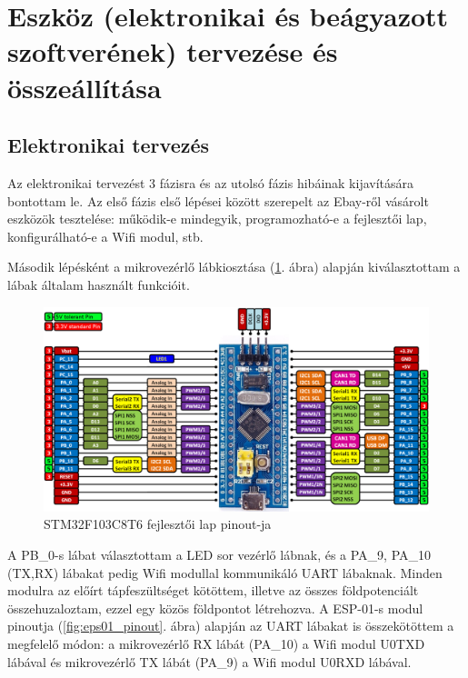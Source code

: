 \documentclass[../main.tex]{subfiles}
\begin{document}
\section{Eszköz (elektronikai és beágyazott szoftverének) tervezése és összeállítása}
    \subsection{Elektronikai tervezés}
        Az elektronikai tervezést 3 fázisra és az utolsó fázis hibáinak kijavítására bontottam le. Az első fázis első lépései között szerepelt az Ebay-ről vásárolt eszközök tesztelése: működik-e mindegyik, programozható-e a fejlesztői lap, konfigurálható-e a Wifi modul, stb.
        
        Második lépésként a mikrovezérlő lábkiosztása (\ref{fig:stm32f103_pinout}. ábra) alapján kiválasztottam a lábak általam használt funkcióit. 
        
        \begin{figure}[h!]
            \centering
                \includegraphics[width=14cm]{resources/pcb_res/stm32f103c8t6_pinout.png}
            \caption{STM32F103C8T6 fejlesztői lap pinout-ja}
            \label{fig:stm32f103_pinout}
        \end{figure}
        
        A PB\_0-s lábat választottam a LED sor vezérlő lábnak, és a PA\_9, PA\_10 (TX,RX) lábakat pedig Wifi modullal kommunikáló UART lábaknak. Minden modulra az előírt tápfeszültséget kötöttem, illetve az összes földpotenciált összehuzaloztam, ezzel egy közös földpontot létrehozva. A ESP-01-s modul pinoutja (\ref{fig:eps01_pinout}. ábra) alapján az UART lábakat is összekötöttem a megfelelő módon: a mikrovezérlő RX lábát (PA\_10) a Wifi modul U0TXD lábával és mikrovezérlő TX lábát (PA\_9) a Wifi modul U0RXD lábával. 
        
\end{document}
